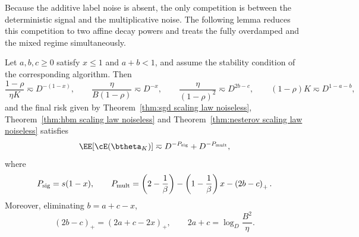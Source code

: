 Because the additive label noise is absent, the only competition is between the deterministic signal and the multiplicative noise. The following lemma reduces this competition to two affine decay powers and treats the fully overdamped and the mixed regime simultaneously.

\begin{lemma}
\label{lem:noiseless_decay_powers}
Let \(a,b,c\geq0\) satisfy \(x\leq1\) and \(a+b<1\), and assume the stability condition of the corresponding algorithm. Then
\[
    \frac{1-\rho}{\eta K}\eqsim D^{-(1-x)},
    \qquad
    \frac{\eta}{B(1-\rho)}\eqsim D^{-x},
    \qquad
    \frac{\eta}{(1-\rho)^{2}}\eqsim D^{2b-c},
    \qquad
    (1-\rho)K\eqsim D^{1-a-b},
\]
and the final risk given by Theorem~\ref{thm:sgd scaling law noiseless}, Theorem~\ref{thm:hbm scaling law noiseless} and Theorem~\ref{thm:nesterov scaling law noiseless} satisfies
\[
    \EE[\cE(\btheta_K)]
    \eqsim
    D^{-P_{\rm sig}}+D^{-P_{\rm mult}},
\]
where
\[
    P_{\rm sig}=s(1-x),
    \qquad
    P_{\rm mult}
    =
    \left(2-\frac1\beta\right)
    -\left(1-\frac1\beta\right)x
    -\left(2b-c\right)_{+}.
\]
Moreover, eliminating \(b=a+c-x\),
\[
    \left(2b-c\right)_{+}=\left(2a+c-2x\right)_{+},
    \qquad
    2a+c=\log_{D}\frac{B^{2}}{\eta}.
\]
\end{lemma}

